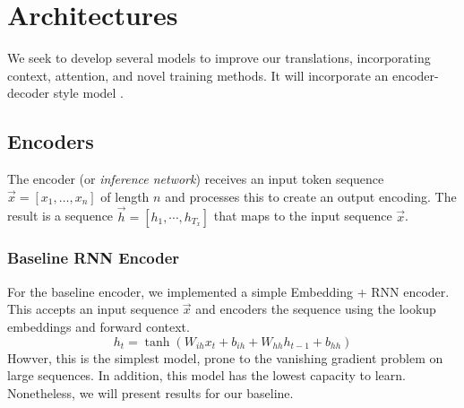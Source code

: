 \documentclass[twoside,twocolumn]{article}
\begin{document}

\section{Architectures}
We seek to develop several models to improve our translations, incorporating
context, attention, and novel training methods. It will
incorporate an encoder-decoder style model \cite{cho2014learning}
\cite{sutskever2014sequence}.

\subsection{Encoders}
The encoder (or \emph{inference network}) receives an input token sequence
$\vec{x} = \left[{x_1,\hdots, x_n}\right]$ of length $n$ and processes
this to create an output encoding. The result is a sequence
$\vec{h} = \left[{h_1, \cdots, h_{T_x}}\right]$ that
maps to the input sequence $\vec{x}$.
\subsubsection{Baseline RNN Encoder}
For the baseline encoder, we implemented a simple Embedding + RNN encoder.
This accepts an input sequence $\vec{x}$ and encoders the sequence using the lookup
embeddings and forward context.
\begin{equation}
  \label{eq:rnn}
  h_t = \tanh(W_{ih} x_t + b_{ih}  +  W_{hh} h_{t-1} + b_{hh})
\end{equation}
Howver, this is the simplest model, prone to the vanishing gradient problem
on large sequences. In addition, this model has the lowest capacity to learn.
Nonetheless, we will present results for our baseline.
\end{document}
